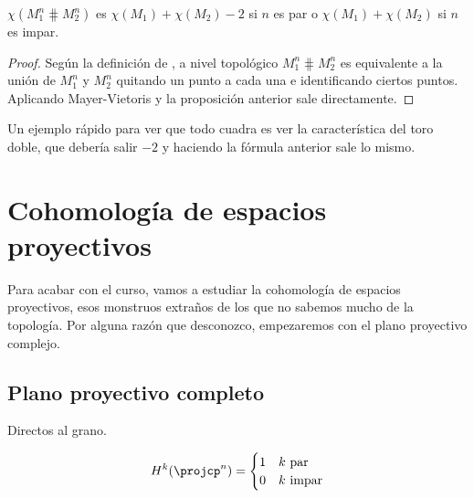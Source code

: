 \documentclass[palatino, bibnumbers]{apuntes}
\begin{document}
\begin{prop} $χ(M_1^n \hash M_2^n)$ es $χ(M_1) + χ(M_2) - 2$ si $n$ es par o $χ(M_1)+ χ(M_2)$ si $n$ es impar.
\end{prop}

\begin{proof} Según la definición de , a nivel topológico $M_1^n \hash M_2^n$ es equivalente a la unión de $M_1^n$ y $M_2^n$ quitando un punto a cada una e identificando ciertos puntos. Aplicando Mayer-Vietoris y la proposición anterior sale directamente.
\end{proof}

Un ejemplo rápido para ver que todo cuadra es ver la característica del toro doble, que debería salir $-2$ y haciendo la fórmula anterior sale lo mismo.

\section{Cohomología de espacios proyectivos}

Para acabar con el curso, vamos a estudiar la cohomología de espacios proyectivos, esos monstruos extraños de los que no sabemos mucho de la topología. Por alguna razón que desconozco, empezaremos con el plano proyectivo complejo.

\subsection{Plano proyectivo completo}

Directos al grano.

\begin{theorem}
\[
	H^k(\projcp^n) =
		\begin{cases}
				1 & k \text{ par}\\
				0 & k \text{ impar}\\
		\end{cases}
\]
\end{theorem}
\end{document}

